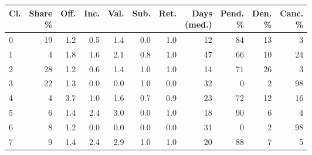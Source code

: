 \begin{tabular}{@{}lrrrrrrrrrr@{}}
\toprule
Cl. & \makecell[r]{Share\\\%} & Off. & Inc. & Val. & Sub. & Ret. & \makecell[r]{Days\\(med.)} & \makecell[r]{Pend.\\\%} & \makecell[r]{Den.\\\%} & \makecell[r]{Canc.\\\%} \\
\midrule
0 & 19 & 1.2 & 0.5 & 1.4 & 0.0 & 1.0 & 12 & 84 & 13 & 3 \\
1 & 4 & 1.8 & 1.6 & 2.1 & 0.8 & 1.0 & 47 & 66 & 10 & 24 \\
2 & 28 & 1.2 & 0.6 & 1.4 & 1.0 & 1.0 & 14 & 71 & 26 & 3 \\
3 & 22 & 1.3 & 0.0 & 0.0 & 1.0 & 0.0 & 32 & 0 & 2 & 98 \\
4 & 4 & 3.7 & 1.0 & 1.6 & 0.7 & 0.9 & 23 & 72 & 12 & 16 \\
5 & 6 & 1.4 & 2.4 & 3.0 & 0.0 & 1.0 & 18 & 90 & 6 & 4 \\
6 & 8 & 1.2 & 0.0 & 0.0 & 0.0 & 0.0 & 31 & 0 & 2 & 98 \\
7 & 9 & 1.4 & 2.4 & 2.9 & 1.0 & 1.0 & 20 & 88 & 7 & 5 \\
\bottomrule
\end{tabular}
